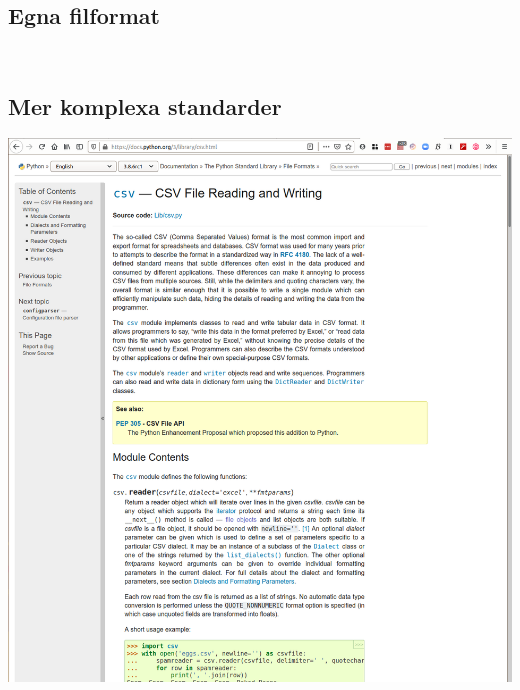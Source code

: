 \subsection{Egna filformat}

\begin{frame}[fragile]
  \begin{example}[xy.py]
    \inputminted[firstline=3,lastline=10,firstnumber=3]{python}{examples/xy.py}
  \end{example}
\end{frame}

\begin{frame}[fragile]
  \begin{example}[xy.py]
    \inputminted[firstline=12,lastline=26,firstnumber=12]{python}{examples/xy.py}
  \end{example}
\end{frame}

\subsection{Mer komplexa standarder}

\begin{frame}
  \includegraphics[width=\columnwidth]{figs/docs-csv.png}
\end{frame}


